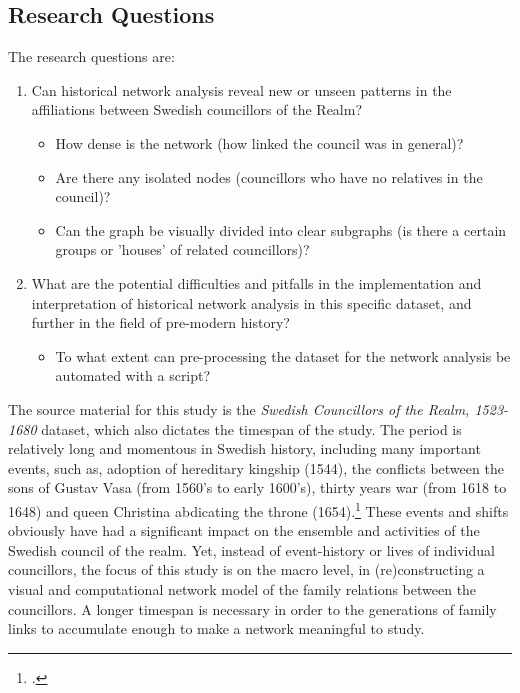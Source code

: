 \subsection{Research Questions}
The research questions are:
\begin{enumerate}
	\item Can historical network analysis reveal new or unseen patterns in the affiliations between Swedish councillors of the Realm? \begin{itemize}
		\item How dense is the network (how linked the council was in general)?
		\item Are there any isolated nodes (councillors who have no relatives in the council)?
		\item Can the graph be visually divided into clear subgraphs (is there a certain groups or 'houses' of related councillors)?
	\end{itemize}	
	\item What are the potential difficulties and pitfalls in the implementation and interpretation of historical network analysis in this specific dataset, and further in the field of pre-modern history? \begin{itemize}	
		\item To what extent can pre-processing the dataset for the network analysis be automated with a script?
	\end{itemize}
\end{enumerate} 

The source material for this study is the \textit{Swedish Councillors of the Realm, 1523-1680} dataset, which also dictates the timespan of the study. The period is relatively long and momentous in Swedish history, including many important events, such as, adoption of hereditary kingship (1544), the conflicts between the sons of Gustav Vasa (from 1560's to early 1600's), thirty years war (from 1618 to 1648) and queen Christina abdicating the throne (1654).\footcite[pp. 8-9.]{personalAgency} These events and shifts obviously have had a significant impact on the ensemble and activities of the Swedish council of the realm. Yet, instead of event-history or lives of individual councillors, the focus of this study is on the macro level, in (re)constructing a visual and computational network model of the family relations between the councillors. A longer timespan is necessary in order to the generations of family links to accumulate enough to make a network meaningful to study.

